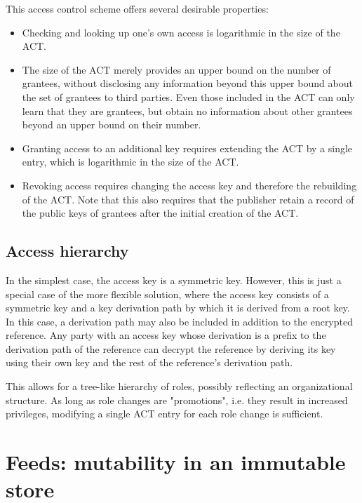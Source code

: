 This access control scheme offers several desirable properties:
\begin{itemize}
\item Checking and looking up one's own access is logarithmic in the size of the ACT.
\item The size of the ACT merely provides an upper bound on the number of grantees, without disclosing any information beyond this upper bound about the set of grantees to third parties. Even those included in the ACT can only learn that they are grantees, but obtain no information about other grantees beyond an upper bound on their number.
\item Granting access to an additional key requires extending the ACT by a single entry, which is logarithmic in the size of the ACT. 
\item Revoking access requires changing the access key and therefore the rebuilding of the ACT. Note that this also requires that the publisher retain a record of the public keys of grantees after the initial creation of the ACT.
\end{itemize}

\subsection{Access hierarchy\statusgreen}

In the simplest case, the access key is a symmetric key. However, this is just a special case of the more flexible solution, where
the access key consists of a symmetric key and a key derivation path by which it is derived from a root key. In this case, a derivation path may also be included in addition to the encrypted reference. Any party with an access key whose derivation is a prefix to the derivation path of the reference can decrypt the reference by deriving its key using their own key and the rest of the reference's derivation path.

This allows for a tree-like hierarchy of roles, possibly reflecting an organizational structure. As long as role changes are "promotions", i.e. they result in increased privileges, modifying a single ACT entry for each role change is sufficient.




\section{Feeds: mutability in an immutable store \statusyellow}\label{sec:feeds}

